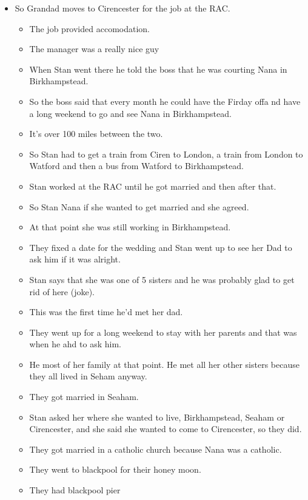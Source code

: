 \documentclass[10pt,twocolumn,letterpaper]{article}
\begin{document}
\begin{itemize}
    \item So Grandad moves to Cirencester for the job at the RAC.
          \begin{itemize}
              \item The job provided accomodation.
              \item The manager was a really nice guy
              \item When Stan went there he told the boss that he was courting Nana in Birkhampstead.
              \item So the boss said that every month he could have the Firday offa nd have a long weekend to go and see Nana in Birkhampstead.
              \item It's over 100 miles between the two.
              \item So Stan had to get a train from Ciren to London, a train from London to Watford and then a bus from Watford to Birkhampstead.
              \item Stan worked at the RAC until he got married and then after that.
              \item So Stan Nana if she wanted to get married and she agreed.
              \item At that point she was still working in Birkhampstead.
              \item They fixed a date for the wedding and Stan went up to see her Dad to ask him if it was alright.
              \item Stan says that she was one of 5 sisters and he was probably glad to get rid of here (joke).
              \item This was the first time he'd met her dad.
              \item They went up for a long weekend to stay with her parents and that was when he ahd to ask him.
              \item He most of her family at that point. He met all her other sisters because they all lived in Seham anyway.
              \item They got married in Seaham.
              \item Stan asked her where she wanted to live, Birkhampstead, Seaham or Cirencester, and she said she wanted to come to Cirencester, so they did.
              \item They got married in a catholic church because Nana was a catholic.
              \item They went to blackpool for their honey moon.
              \item They had blackpool pier

\end{itemize}
\end{itemize}
\end{document}

